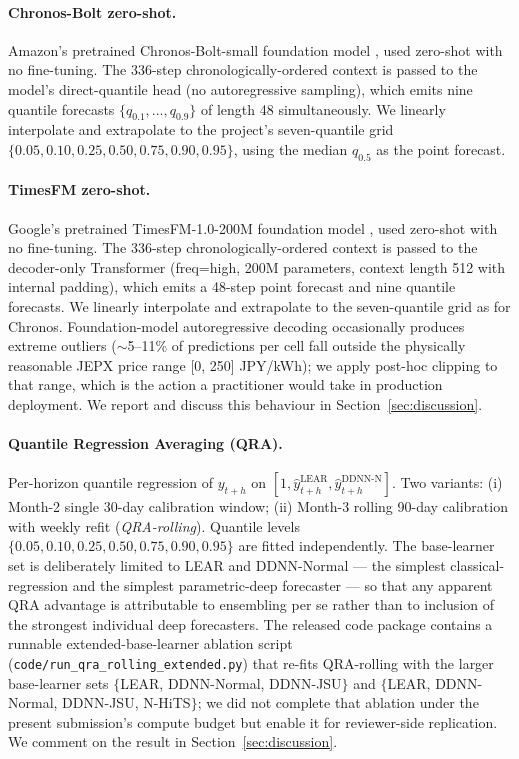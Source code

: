 \documentclass[review,3p,times,authoryear]{elsarticle}
\begin{document}
\paragraph{Chronos-Bolt zero-shot.} Amazon's pretrained Chronos-Bolt-small foundation model \citep{ansari2024chronos}, used zero-shot with no fine-tuning. The 336-step chronologically-ordered context is passed to the model's direct-quantile head (no autoregressive sampling), which emits nine quantile forecasts \(\{q_{0.1}, \ldots, q_{0.9}\}\) of length 48 simultaneously. We linearly interpolate and extrapolate to the project's seven-quantile grid \(\{0.05, 0.10, 0.25, 0.50, 0.75, 0.90, 0.95\}\), using the median \(q_{0.5}\) as the point forecast.

\paragraph{TimesFM zero-shot.} Google's pretrained TimesFM-1.0-200M foundation model \citep{das2024timesfm}, used zero-shot with no fine-tuning. The 336-step chronologically-ordered context is passed to the decoder-only Transformer (freq=high, 200M parameters, context length 512 with internal padding), which emits a 48-step point forecast and nine quantile forecasts. We linearly interpolate and extrapolate to the seven-quantile grid as for Chronos. Foundation-model autoregressive decoding occasionally produces extreme outliers (\(\sim\)5--11\% of predictions per cell fall outside the physically reasonable JEPX price range [0, 250] JPY/kWh); we apply post-hoc clipping to that range, which is the action a practitioner would take in production deployment. We report and discuss this behaviour in Section~\ref{sec:discussion}.

\paragraph{Quantile Regression Averaging (QRA).} Per-horizon quantile regression of \(y_{t+h}\) on \([1, \hat{y}^{\mathrm{LEAR}}_{t+h}, \hat{y}^{\mathrm{DDNN}\text{-}\mathrm{N}}_{t+h}]\). Two variants: (i) Month-2 single 30-day calibration window; (ii) Month-3 rolling 90-day calibration with weekly refit (\emph{QRA-rolling}). Quantile levels \(\{0.05, 0.10, 0.25, 0.50, 0.75, 0.90, 0.95\}\) are fitted independently. The base-learner set is deliberately limited to LEAR and DDNN-Normal --- the simplest classical-regression and the simplest parametric-deep forecaster --- so that any apparent QRA advantage is attributable to ensembling per se rather than to inclusion of the strongest individual deep forecasters. The released code package contains a runnable extended-base-learner ablation script (\texttt{code/run\_qra\_rolling\_extended.py}) that re-fits QRA-rolling with the larger base-learner sets \(\{\)LEAR, DDNN-Normal, DDNN-JSU\(\}\) and \(\{\)LEAR, DDNN-Normal, DDNN-JSU, N-HiTS\(\}\); we did not complete that ablation under the present submission's compute budget but enable it for reviewer-side replication. We comment on the result in Section~\ref{sec:discussion}.
\end{document}
